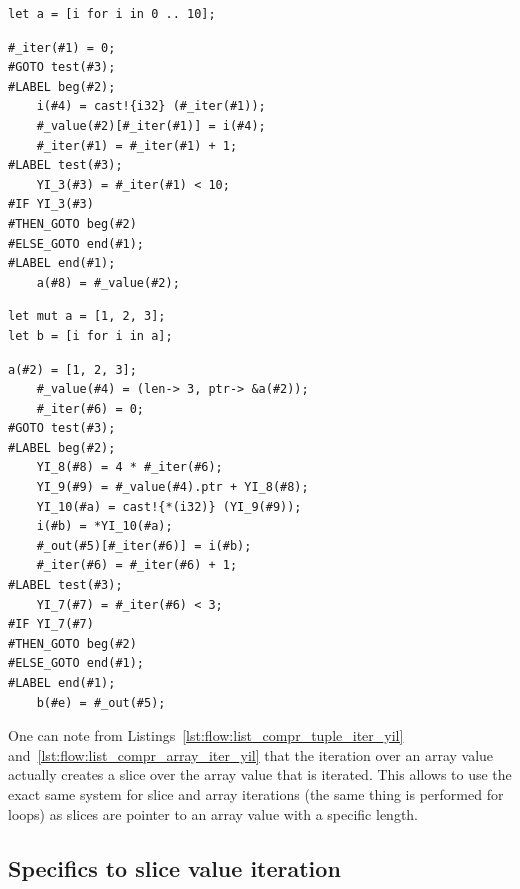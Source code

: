 \begin{lstlisting}[style=coloredverbatim, label=lst:flow:list_compr_range_iter, caption=List comprehension iterating over a range]
let a = [i for i in 0 .. 10];
\end{lstlisting}

\begin{lstlisting}[style=lyilVerb, label=lst:flow:list_compr_range_iter_yil, caption=YIL representation of Listing~\ref{lst:flow:list_compr_range_iter}]
    #_iter(#1) = 0;
#GOTO test(#3);
#LABEL beg(#2);
    i(#4) = cast!{i32} (#_iter(#1));
    #_value(#2)[#_iter(#1)] = i(#4);
    #_iter(#1) = #_iter(#1) + 1;
#LABEL test(#3);
    YI_3(#3) = #_iter(#1) < 10;
#IF YI_3(#3)
#THEN_GOTO beg(#2)
#ELSE_GOTO end(#1);
#LABEL end(#1);
    a(#8) = #_value(#2);
\end{lstlisting}

\begin{lstlisting}[style=coloredverbatim, label=lst:flow:list_compr_array_iter, caption=List comprehension iterating over an array]
let mut a = [1, 2, 3];
let b = [i for i in a];
\end{lstlisting}

\begin{lstlisting}[style=lyilVerb, label=lst:flow:list_compr_array_iter_yil, caption=YIL representation of Listing~\ref{lst:flow:list_compr_array_iter}]
    a(#2) = [1, 2, 3];
    #_value(#4) = (len-> 3, ptr-> &a(#2));
    #_iter(#6) = 0;
#GOTO test(#3);
#LABEL beg(#2);
    YI_8(#8) = 4 * #_iter(#6);
    YI_9(#9) = #_value(#4).ptr + YI_8(#8);
    YI_10(#a) = cast!{*(i32)} (YI_9(#9));
    i(#b) = *YI_10(#a);
    #_out(#5)[#_iter(#6)] = i(#b);
    #_iter(#6) = #_iter(#6) + 1;
#LABEL test(#3);
    YI_7(#7) = #_iter(#6) < 3;
#IF YI_7(#7)
#THEN_GOTO beg(#2)
#ELSE_GOTO end(#1);
#LABEL end(#1);
    b(#e) = #_out(#5);
\end{lstlisting}

One can note from Listings~\ref{lst:flow:list_compr_tuple_iter_yil}
and~\ref{lst:flow:list_compr_array_iter_yil} that the iteration over an array value
actually creates a slice over the array value that is iterated. This allows to
use the exact same system for slice and array iterations (the same thing is
performed for  loops) as slices are pointer to an array value with a
specific length.

\subsection{Specifics to slice value iteration}


